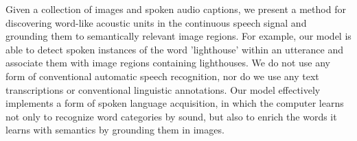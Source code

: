 Given a collection of images and spoken audio captions, we present a method for discovering word-like acoustic units in the continuous speech signal and grounding them to semantically relevant image regions. For example, our model is able to detect spoken instances of the word 'lighthouse' within an utterance and associate them with image regions containing lighthouses. We do not use any form of conventional automatic speech recognition, nor do we use any text transcriptions or conventional linguistic annotations. Our model effectively implements a form of spoken language acquisition, in which the computer learns not only to recognize word categories by sound, but also to enrich the words it learns with semantics by grounding them in images.
